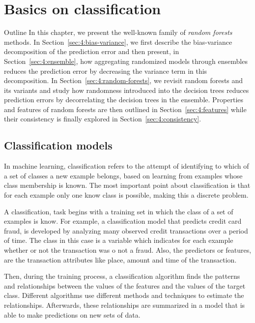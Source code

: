 \chapter{Basics on classification}

\begin{remark}{Outline}
In this chapter, we present the well-known family of \textit{random forests}
methods. In Section~\ref{sec:4:bias-variance}, we first describe the bias-variance
decomposition of the prediction error and then present, in
Section~\ref{sec:4:ensemble}, how aggregating randomized models through
ensembles reduces the prediction error by decreasing the variance term in this
decomposition. In Section~\ref{sec:4:random-forests}, we revisit random forests
and its variants and study how randomness introduced into the decision trees
reduces prediction errors by decorrelating the decision
trees in the ensemble. Properties and features of random forests are then outlined
in Section~\ref{sec:4:features} while their consistency
is finally explored in Section~\ref{sec:4:consistency}.
\end{remark}


\section{Classification models}
In machine learning, classification refers to the attempt of identifying to which of a set of 
classes a new example belongs, based on learning from examples whose class membership is known. 
The most important point about classification is that for each example only one know class is 
possible, making this a discrete problem. 

A classification, task begins with a training set in which the class of a set of examples is know. 
For example, a classification model that predicts credit card fraud, is developed by analyzing 
many observed credit transactions over a period of time. The class in this case is a variable which 
indicates for each example whether or not the transaction was o not a fraud. Also, the predictors 
or features, are the transaction attributes like place, amount and time of the transaction.

Then, during the training process, a classification algorithm finds the patterns and relationships 
between the values of the features and the values of the target class. Different algorithms use 
different methods and techniques to estimate the relationships. Afterwards, these relationships are 
summarized in a model that is able to make predictions on new sets of data.

